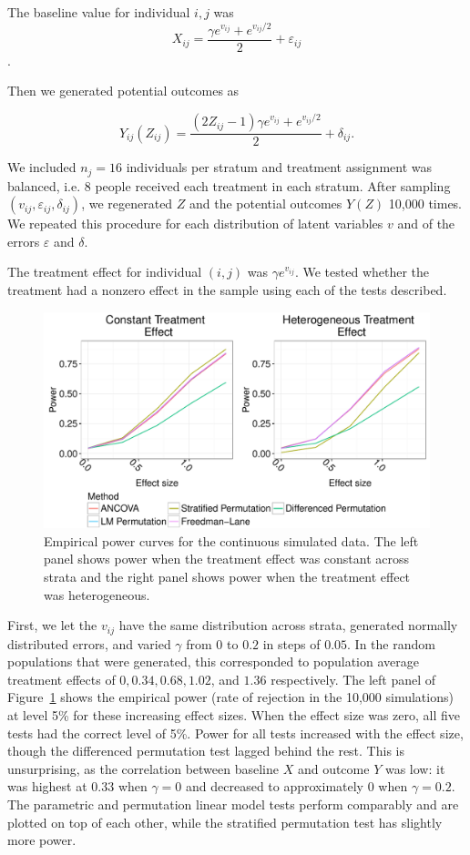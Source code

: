 \documentclass[12pt]{article}
\begin{document}
The baseline value for individual $i,j$ was 
$$ X_{ij} = \frac{\gamma e^{v_{ij}} + e^{v_{ij}/2}}{2} + \varepsilon_{ij}$$.

Then we generated potential outcomes as

$$Y_{ij}(Z_{ij}) = \frac{(2Z_{ij} - 1)\gamma e^{v_{ij}} + e^{v_{ij}/2}}{2} + \delta_{ij}.$$

We included $n_j=16$ individuals per stratum and treatment assignment was balanced, i.e. 8 people received each treatment in each stratum.
After sampling $(v_{ij}, \varepsilon_{ij}, \delta_{ij})$, we regenerated $Z$ and the potential outcomes $Y(Z)$ 10,000 times.
We repeated this procedure for each distribution of latent variables $v$ and of the errors $\varepsilon$ and $\delta$.

The treatment effect for individual $(i, j)$ was $\gamma e^{v_{ij}}$.
We tested whether the treatment had a nonzero effect in the sample using each of the tests described.

\begin{figure}[h]
\centering
\includegraphics[width = \textwidth]{fig/continuous_outcomes_simulation_power.pdf}
\caption{Empirical power curves for the continuous simulated data. The left panel shows power when the treatment effect was constant across strata and the right panel shows power when the treatment effect was heterogeneous.}
\label{fig:continuous_outcomes_sim_power}
\end{figure}

First, we let the $v_{ij}$ have the same distribution across strata, generated normally distributed errors, and varied $\gamma$ from $0$ to $0.2$ in steps of $0.05$.
In the random populations that were generated, this corresponded to population average treatment effects of $0, 0.34, 0.68, 1.02$, and $1.36$ respectively.
The left panel of Figure~\ref{fig:continuous_outcomes_sim_power} shows the empirical power (rate of rejection in the 10,000 simulations) at level 5\% for these increasing effect sizes.
When the effect size was zero, all five tests had the correct level of 5\%.
Power for all tests increased with the effect size, though the differenced permutation test lagged behind the rest.
This is unsurprising, as the correlation between baseline $X$ and outcome $Y$ was low:
it was highest at $0.33$ when $\gamma=0$ and decreased to approximately $0$ when $\gamma=0.2$.
The parametric and permutation linear model tests perform comparably and are plotted on top of each other, while the stratified permutation test has slightly more power.
\end{document}
